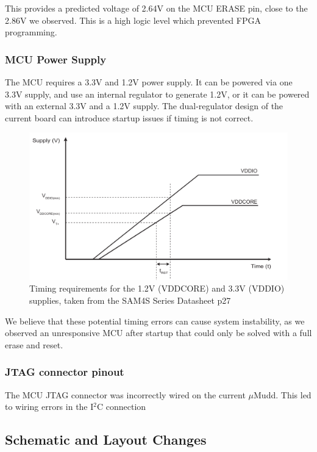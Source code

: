 \documentclass[12pt]{article}
\begin{document}
This provides a predicted voltage of 2.64V on the MCU ERASE pin, close to the 2.86V we observed. This is a high logic level which prevented FPGA programming.

\subsubsection{MCU Power Supply}

The MCU requires a 3.3V and 1.2V power supply. It can be powered via one 3.3V supply, and use an internal regulator to generate 1.2V, or it can be powered with an external 3.3V and a 1.2V supply. The dual-regulator design of the current board can introduce startup issues if timing is not correct.

\begin{figure}
	\begin{center}
	\includegraphics[width=13cm]{power_timing.png}
	\caption{Timing requirements for the 1.2V (VDDCORE) and 3.3V (VDDIO) supplies, taken from the SAM4S Series Datasheet p27}	
	\end{center}
\end{figure}

We believe that these potential timing errors can cause system instability, as we observed an unresponsive MCU after startup that could only be solved with a full erase and reset.

\subsubsection{JTAG connector pinout}

The MCU JTAG connector was incorrectly wired on the current $\mu$Mudd. This led to wiring errors in the I$^2$C connection

\subsection{Schematic and Layout Changes}
\end{document}
